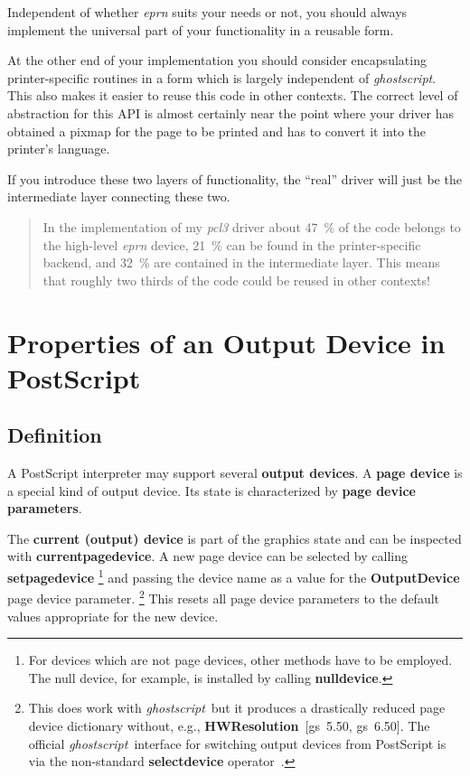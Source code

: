 \documentclass[twoside,a4paper]{article}
\newcommand{\gs}{\textit{ghostscript\/}}
\newenvironment{note}{\begin{quote}\small}{\end{quote}}
\newcommand{\ps}[1]{{\sffamily\bfseries #1}}	%
\renewcommand{\d}[1]{{\bfseries #1}}	%
\begin{document}
Independent of whether \textit{eprn\/} suits your needs or not,
you should always implement the universal part of your functionality
in a reusable form.

At the other end of your implementation you should consider encapsulating
printer-specific routines in a form which is largely independent of \gs.
This also makes it easier to reuse this code in other contexts.
The correct level of abstraction for this API is almost certainly near the
point where your driver has obtained a pixmap for the page to be printed and
has to convert it into the printer's language.

If you introduce these two layers of functionality,
the ``real'' driver will just be the intermediate layer connecting these two.
\begin{note}
  In the implementation of my \textit{pcl3\/} driver about
  47~\% of the code belongs to the high-level \textit{eprn\/} device,
  21~\% can be found in the printer-specific backend,
  and 32~\% are contained in the intermediate layer.
  This means that roughly two thirds of the code could be reused
  in other contexts!
\end{note}


\section{Properties of an Output Device in PostScript}


\subsection{Definition}

A PostScript interpreter may support several \d{output devices}.
A \d{page device} is a special kind of output device.
Its state is characterized by \d{page device parameters}.

The \d{current (output) device} is part of the graphics state and can be
inspected with \ps{currentpagedevice}.
A new page device can be selected by calling \ps{setpagedevice}%
  \footnote{%
    For devices which are not page devices, other methods have to be
    employed.
    The null device, for example, is installed by calling \ps{nulldevice}.}
and passing the device name as a value for the \ps{OutputDevice} page device
parameter.%
  \footnote{%
    This does work with \gs\ but it produces a drastically reduced page device
    dictionary without, e.g., \ps{HWResolution}~[gs~5.50, gs~6.50].
    The official \gs\ interface for switching output devices from PostScript
    is via the non-standard \ps{selectdevice} operator~\cite{Use5.50}.}
This resets all page device parameters to the default values appropriate for
the new device.
\end{document}

